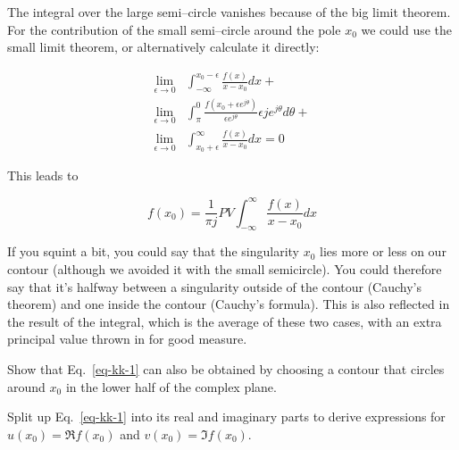 The integral over the large semi--circle vanishes because of the big limit theorem. For the contribution of the small semi--circle around the pole $x_0$ we could use the small limit theorem, or alternatively calculate it directly:

\begin{align}
\lim_{\epsilon \to 0} & \int_{- \infty}^{x_0-\epsilon} \frac{f(x)}{x-x_0}dx + \nonumber \\
\lim_{\epsilon \to 0} & \int_{\pi}^0 \frac{f(x_0+\epsilon e^{j \theta})}{\epsilon e^{j\theta}} \epsilon j e^{j \theta} d \theta + \nonumber \\
\lim_{\epsilon \to 0} & \int_{x_0+\epsilon}^{\infty} \frac{f(x)}{x-x_0}dx = 0
\end{align} 

This leads to 

\begin{equation}
f(x_0) = \frac{1}{\pi j} PV \int_{- \infty}^{\infty} \frac{f(x)}{x-x_0}dx
\label{eq-kk-1}
\end{equation} 

If you squint a bit, you could say that the singularity $x_0$ lies more or less on our contour (although we avoided it with the small semicircle). You could therefore say that it's halfway between a singularity outside of the contour (Cauchy's theorem) and one inside the contour (Cauchy's formula). This is also reflected in the result of the integral, which is the average of these two cases, with an extra principal value thrown in for good measure.

\begin{exer}
Show that Eq.~\ref{eq-kk-1} can also be obtained by choosing a contour that circles around $x_0$ in the lower half of the complex plane.
\end{exer}

\begin{cue}
Split up Eq.~\ref{eq-kk-1} into its real and imaginary parts to derive expressions for $ u(x_0)= \Re f(x_0)$ and $ v(x_0)= \Im f(x_0)$.
\end{cue}

